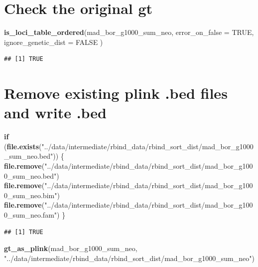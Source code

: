 \documentclass[
]{article}
\newenvironment{Shaded}{\begin{snugshade}}{\end{snugshade}}
\newcommand{\AttributeTok}[1]{\textcolor[rgb]{0.13,0.29,0.53}{#1}}
\newcommand{\ConstantTok}[1]{\textcolor[rgb]{0.56,0.35,0.01}{#1}}
\newcommand{\ControlFlowTok}[1]{\textcolor[rgb]{0.13,0.29,0.53}{\textbf{#1}}}
\newcommand{\FunctionTok}[1]{\textcolor[rgb]{0.13,0.29,0.53}{\textbf{#1}}}
\newcommand{\NormalTok}[1]{#1}
\newcommand{\StringTok}[1]{\textcolor[rgb]{0.31,0.60,0.02}{#1}}
\begin{document}
\section{Check the original gt}\label{check-the-original-gt}

\begin{Shaded}
\begin{Highlighting}[]
\FunctionTok{is\_loci\_table\_ordered}\NormalTok{(mad\_bor\_g1000\_sum\_neo,}
  \AttributeTok{error\_on\_false =} \ConstantTok{TRUE}\NormalTok{,}
  \AttributeTok{ignore\_genetic\_dist =} \ConstantTok{FALSE}
\NormalTok{)}
\end{Highlighting}
\end{Shaded}

\begin{verbatim}
## [1] TRUE
\end{verbatim}

\section{Remove existing plink .bed files and write
.bed}\label{remove-existing-plink-.bed-files-and-write-.bed}

\begin{Shaded}
\begin{Highlighting}[]
\ControlFlowTok{if}\NormalTok{ (}\FunctionTok{file.exists}\NormalTok{(}\StringTok{"../data/intermediate/rbind\_data/rbind\_sort\_dist/mad\_bor\_g1000\_sum\_neo.bed"}\NormalTok{)) \{}
  \FunctionTok{file.remove}\NormalTok{(}\StringTok{"../data/intermediate/rbind\_data/rbind\_sort\_dist/mad\_bor\_g1000\_sum\_neo.bed"}\NormalTok{)}
  \FunctionTok{file.remove}\NormalTok{(}\StringTok{"../data/intermediate/rbind\_data/rbind\_sort\_dist/mad\_bor\_g1000\_sum\_neo.bim"}\NormalTok{)}
  \FunctionTok{file.remove}\NormalTok{(}\StringTok{"../data/intermediate/rbind\_data/rbind\_sort\_dist/mad\_bor\_g1000\_sum\_neo.fam"}\NormalTok{)}
\NormalTok{\}}
\end{Highlighting}
\end{Shaded}

\begin{verbatim}
## [1] TRUE
\end{verbatim}

\begin{Shaded}
\begin{Highlighting}[]
\FunctionTok{gt\_as\_plink}\NormalTok{(mad\_bor\_g1000\_sum\_neo, }\StringTok{"../data/intermediate/rbind\_data/rbind\_sort\_dist/mad\_bor\_g1000\_sum\_neo"}\NormalTok{)}
\end{Highlighting}
\end{Shaded}
\end{document}
